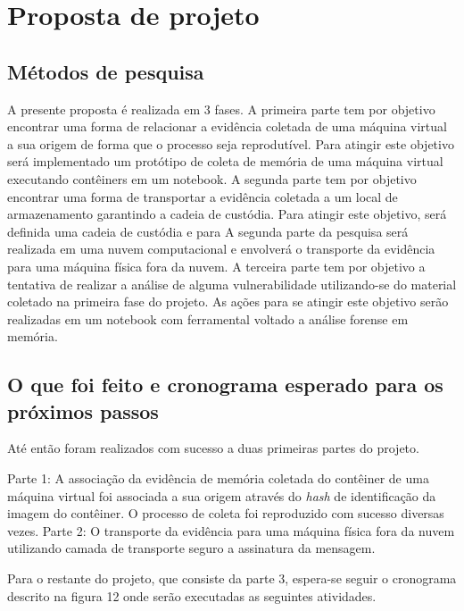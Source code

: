 \chapter{Proposta de projeto}

\section{Métodos de pesquisa}

A presente proposta é realizada em 3 fases.
%
A primeira parte tem por objetivo encontrar uma forma de relacionar a evidência coletada de uma máquina virtual a sua origem de forma que o processo seja reprodutível. 
%
Para atingir este objetivo será implementado um protótipo de coleta de memória de uma máquina virtual executando contêiners em um notebook.
%
A segunda parte tem por objetivo encontrar uma forma de transportar a evidência coletada a um local de armazenamento garantindo a cadeia de custódia.
%
Para atingir este objetivo, será definida uma cadeia de custódia e para A segunda parte da pesquisa será realizada em uma nuvem computacional e envolverá o transporte da evidência para uma máquina física fora da nuvem.
%
A terceira parte tem por objetivo a tentativa de realizar a análise de alguma vulnerabilidade utilizando-se do material coletado na primeira fase do projeto.
%
As ações para se atingir este objetivo serão realizadas em um notebook com ferramental voltado a análise forense em memória.

\section{O que foi feito e cronograma esperado para os próximos passos}

Até então foram realizados com sucesso a duas primeiras partes do projeto.

%
Parte 1: A associação da evidência de memória coletada do contêiner de uma máquina virtual foi associada a sua origem através do \textit{hash} de identificação da imagem do contêiner. O processo de coleta foi reproduzido com sucesso diversas vezes.
%
Parte 2: O transporte da evidência para uma máquina física fora da nuvem utilizando camada de transporte seguro a assinatura da mensagem.
%

Para o restante do projeto, que consiste da parte 3, espera-se seguir o cronograma descrito na figura 12 onde serão executadas as seguintes atividades.

